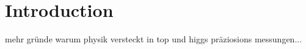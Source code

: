 \chapter{Introduction}




mehr gründe warum physik versteckt in top und higgs präziosions messungen... 
